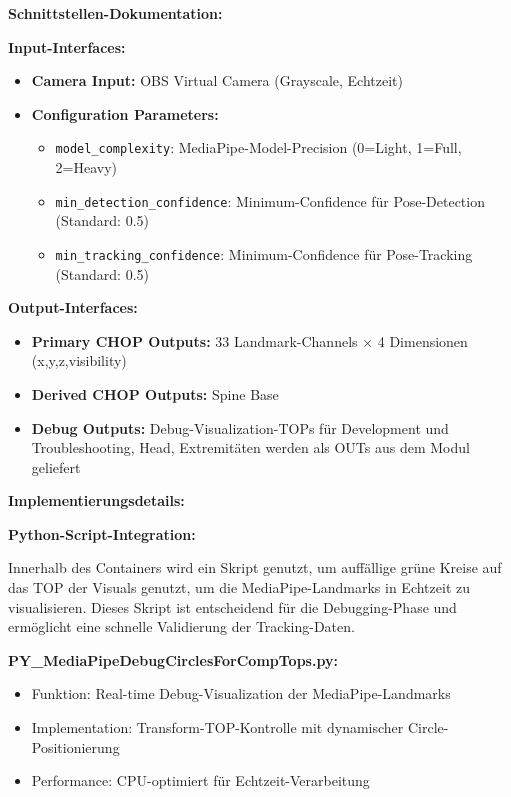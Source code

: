 \textbf{Schnittstellen-Dokumentation:}

\textbf{Input-Interfaces:}
\begin{itemize}
    \item \textbf{Camera Input:} OBS Virtual Camera (Grayscale, Echtzeit)
    \item \textbf{Configuration Parameters:} 
    \begin{itemize}
        \item \texttt{model\_complexity}: MediaPipe-Model-Precision (0=Light, 1=Full, 2=Heavy)
        \item \texttt{min\_detection\_confidence}: Minimum-Confidence für Pose-Detection (Standard: 0.5)
        \item \texttt{min\_tracking\_confidence}: Minimum-Confidence für Pose-Tracking (Standard: 0.5)
    \end{itemize}
\end{itemize}

\textbf{Output-Interfaces:}
\begin{itemize}
    \item \textbf{Primary CHOP Outputs:} 33 Landmark-Channels × 4 Dimensionen (x,y,z,visibility)
    \item \textbf{Derived CHOP Outputs:} Spine Base
    \item \textbf{Debug Outputs:} Debug-Visualization-TOPs für Development und Troubleshooting, Head, Extremitäten werden als OUTs aus dem Modul geliefert
\end{itemize}

\textbf{Implementierungsdetails:}

\textbf{Python-Script-Integration:}

Innerhalb des Containers wird ein Skript genutzt, um auffällige grüne Kreise auf das TOP der Visuals genutzt, um die MediaPipe-Landmarks in Echtzeit zu visualisieren. Dieses Skript ist entscheidend für die Debugging-Phase und ermöglicht eine schnelle Validierung der Tracking-Daten.

\item \textbf{PY\_MediaPipeDebugCirclesForCompTops.py:}
\begin{itemize}
    \item Funktion: Real-time Debug-Visualization der MediaPipe-Landmarks
    \item Implementation: Transform-TOP-Kontrolle mit dynamischer Circle-Positionierung
    \item Performance: CPU-optimiert für Echtzeit-Verarbeitung
\end{itemize}

